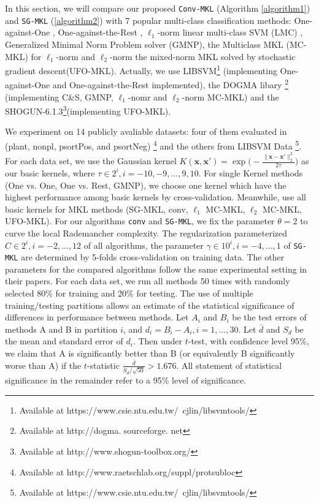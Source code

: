 \documentclass{article}
\begin{document}
In this section, we will  compare our proposed \texttt{Conv-MKL} (Algorithm \ref{algorithm1}) and \texttt{SG-MKL} (\ref{algorithm2})
with 7 popular multi-class classification methods:
 One-against-One \cite{knerr1990single}, One-against-the-Rest \cite{bottou1994comparison},
$\ell_1$-norm linear multi-class SVM (LMC) \cite{CrammerS02},
Generalized Minimal Norm Problem solver (GMNP)\cite{franc2005optimization},
the Multiclass MKL (MC-MKL) for $\ell_1$-norm and $\ell_2$-norm \cite{ZienO2007}
 the mixed-norm MKL solved by stochastic gradient descent(UFO-MKL)\cite{OrabonaL11}.
Actually, we use LIBSVM\footnote{Available at https://www.csie.ntu.edu.tw/~cjlin/libsvmtools/}
(implementing One-against-One and One-against-the-Rest implemented),
the DOGMA libary \footnote{Available at http://dogma. sourceforge. net} \cite{orabona2009dogma} (implementing C\&S, GMNP,
$\ell_1$-nomr and $\ell_2$-norm MC-MKL) and the SHOGUN-6.1.3\footnote{Available at http://www.shogun-toolbox.org/}(implementing UFO-MKL).

We experiment on 14 publicly avaliable datasets:
four of them evaluated in \cite{ZienO2007} (plant, nonpl, psortPos, and psortNeg)
\footnote{Available at http://www.raetschlab.org/suppl/protsubloc}
and the others from LIBSVM Data \footnote{Available at https://www.csie.ntu.edu.tw/~cjlin/libsvmtools/}.
For each data set, we use the Gaussian kernel
$K(\mathbf{x}, \mathbf{x}')=\exp\Big(-\frac{\|\mathbf{x}-\mathbf{x}'\|_2^2}{2\tau}\Big)$ as our basic kernels,
where $\tau \in {2^i, i=-10,-9,\ldots,9,10}$. For single Kernel methods (One vs. One, One vs. Rest, GMNP),
we choose one kernel which have the highest performance among basic kernels by cross-validation.
Meanwhile, use all basic kernels for MKL methods (SG-MKL, conv, $\ell_1$ MC-MKL, $\ell_2$ MC-MKL, UFO-MKL).
For our algorithms \texttt{conv} and \texttt{SG-MKL}, we fix the parameter $\theta=2$ to curve the local Rademancher complexity.
The regularization parameterized $C \in {2^i, i=-2, \ldots, 12}$ of all algorithms,
the parameter $\gamma \in {10^i, i=-4, \ldots, 1}$ of \texttt{SG-MKL} are determined by 5-folds cross-validation on training data.
The other parameters for the compared algorithms follow the same experimental setting in their papers.
For each data set, we run all methods 50 times with randomly selected 80\% for training and 20\% for testing.
The use of multiple training/testing partitions allows an estimate of the statistical significance of differences
in performance between methods. Let $A_i$ and $B_i$ be the test errors of methods A and B in partition $i$,
and $d_i=B_i-A_i, i=1,\ldots,30$. Let $\bar{d}$ and $S_d$ be the mean and standard error of $d_i$.
Then under $t$-test, with confidence level 95\%, we claim that A is significantly better than B (or equivalently B significantly worse than A)
if the $t$-statistic $\frac{\bar{d}}{S_d/\sqrt{50}} > 1.676$.
All statement of statistical significance in the remainder refer to a 95\% level of significance.
\end{document}
